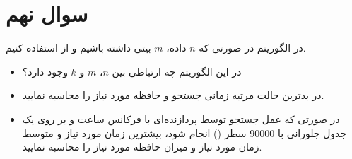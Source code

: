 \section{سوال نهم}

در الگوریتم  در صورتی که $n$ داده، $m$ بیتی داشته باشیم و از  استفاده کنیم.

\begin{itemize}
	\item در این الگوریتم چه ارتباطی بین $n$، $m$ و $k$ وجود دارد؟
	\begin{qsolve}
		
	\end{qsolve}
	
	\item در بدترین حالت مرتبه زمانی جستجو و حافظه مورد نیاز را محاسبه نمایید.
	\begin{qsolve}
		
	\end{qsolve}
	
	\item در صورتی که عمل جستجو توسط پردازنده‌ای با فرکانس ساعت  و بر روی یک جدول جلورانی با \(90000\) سطر () انجام شود، بیشترین زمان مورد نیاز و متوسط زمان مورد نیاز و میزان حافظه مورد نیاز را محاسبه نمایید.
	\begin{qsolve}
		
	\end{qsolve}

\end{itemize}


